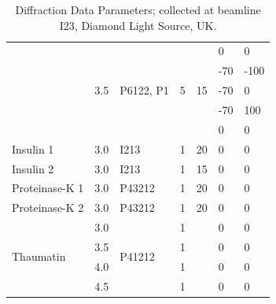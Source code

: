 \begin{table}[]
{\begin{tabular}{@{}lllllll@{}}
                                & \multirow{5}{*}{3.5} & \multirow{5}{*}{P6122, P1} & \multirow{5}{*}{5} & \multirow{5}{*}{15} & 0   & 0    \\
                           &                      &                           &                    &                    & -70   & -100 \\
                           &                      &                           &                    &                    & -70   & 0    \\
                           &                      &                           &                    &                    & -70   & 100  \\
                           &                      &                           &                    &                    & 0     & 0    \\ \midrule
Insulin 1                  & 3.0                  & I213                      & 1                  & 20                 & 0     & 0    \\ \midrule
Insulin 2                  & 3.0                  & I213                      & 1                  & 15                 & 0     & 0    \\ \midrule
Proteinase-K 1             & 3.0                  & P43212                    & 1                  & 20                 & 0     & 0    \\ \midrule
Proteinase-K 2             & 3.0                  & P43212                    & 1                  & 20                 & 0     & 0    \\ \midrule
\multirow{4}{*}{Thaumatin} & 3.0                  & \multirow{4}{*}{P41212}   & 1                  &                    & 0     & 0    \\
                           & 3.5                  &                           & 1                  &                    & 0     & 0    \\
                           & 4.0                  &                           & 1                  &                    & 0     & 0    \\
                           & 4.5                  &                           & 1                  &                    & 0     & 0    \\ \bottomrule
\end{tabular}%
}
\caption{Diffraction Data Parameters; collected at beamline I23, Diamond Light Source, UK.}
\label{diffration_table}
\end{table}

